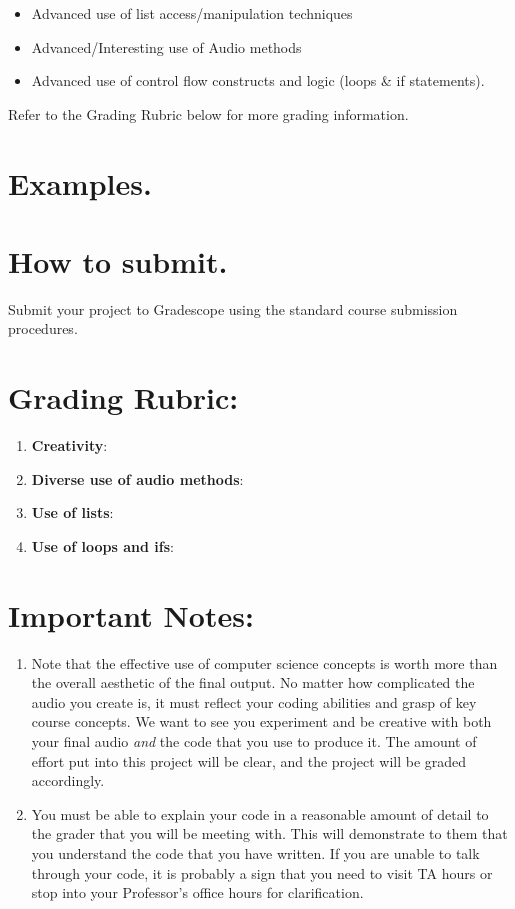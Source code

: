 \documentclass[11pt, letterpaper, onecolumn, oneside, final]{article}
\begin{document}
\begin{itemize}
    \item Advanced use of list access/manipulation techniques
    \item Advanced/Interesting use of Audio methods
    \item Advanced use of control flow constructs and logic (loops \& if statements).
\end{itemize}

Refer to the Grading Rubric below for more grading information.
\newpage
\section{Examples.}
    \section{How to submit.}

    Submit your project to Gradescope using the standard course submission procedures. 
    \section{Grading Rubric:} 
    \begin{enumerate}
        \item \textbf{Creativity}:
        \item \textbf{Diverse use of audio methods}:
        \item \textbf{Use of lists}:
        \item \textbf{Use of loops and ifs}: 

    \end{enumerate}
    \section{Important Notes:} 
    \begin{enumerate}
        \item Note that the effective use of computer science concepts is worth more than the overall aesthetic of the final output. No matter how complicated the audio you create is, it must reflect your coding abilities and grasp of key course concepts. We want to see you experiment and be creative with both your final audio \emph{and} the code that you use to produce it. The amount of effort put into this project will be clear, and the project will be graded accordingly.
        \item You must be able to explain your code in a reasonable amount of detail to the grader that you will be meeting with. This will demonstrate to them that you understand the code that you have written. If you are unable to talk through your code, it is probably a sign that you need to visit TA hours or stop into your Professor's office hours for clarification. 
    \end{enumerate}
\end{document}

